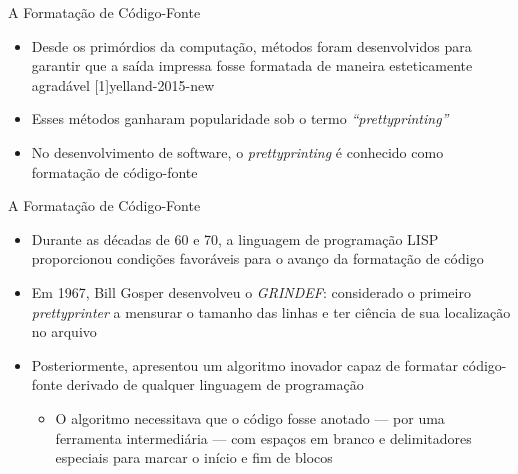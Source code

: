 \documentclass
  [ aspectratio=169,
    english,
    hyperref={citecolor=blue,colorlinks=true,linkcolor=blue,urlcolor=blue},
    brazil]
  {beamer}
\begin{document}

  \begin{frame}{A Formatação de Código-Fonte}
    \begin{itemize}
      \item Desde os primórdios da computação, métodos foram desenvolvidos para
            garantir que a saída impressa fosse formatada de maneira
            esteticamente agradável
            [1]{yelland-2015-new}
      \item Esses métodos ganharam popularidade sob o termo
            \textit{``prettyprinting''}
      \item No desenvolvimento de software, o \textit{prettyprinting} é
            conhecido como formatação de código-fonte
    \end{itemize}
  \end{frame}

  \begin{frame}{A Formatação de Código-Fonte}
    \begin{itemize}
      \item Durante as décadas de 60 e 70, a linguagem de programação LISP
            proporcionou condições favoráveis para o avanço da formatação de
            código \cite[2]{yelland-2015-new}
      \item Em 1967, Bill Gosper desenvolveu o \textit{GRINDEF}: considerado o
            primeiro \textit{prettyprinter} a mensurar o tamanho das linhas e
            ter ciência de sua localização no arquivo
            \cites{gosper-2023-twubblesome}{griesemer-2022-cultural}
      \item Posteriormente, \textcite{oppen-1980-prettyprinting} apresentou um
            algoritmo inovador capaz de formatar código-fonte derivado de
            qualquer linguagem de programação
            \begin{itemize}
              \item O algoritmo necessitava que o código fosse anotado --- por
                    uma ferramenta intermediária --- com espaços em branco e
                    delimitadores especiais para marcar o início e fim de
                    blocos
            \end{itemize}
    \end{itemize}
  \end{frame}
\end{document}
